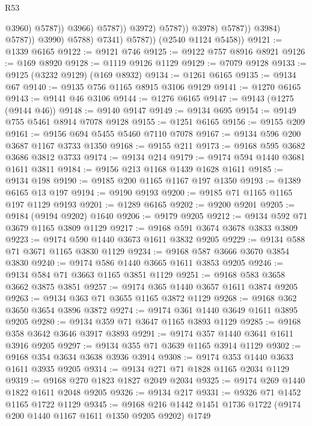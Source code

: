 \begin{lexlean}{R53}
\begin{coremodule}
                                              @3960)
                                            @5787))
                                        @3966)
                                      @5787))
                                  @3972)
                                @5787))
                            @3978)
                          @5787))
                      @3984)
                    @5787))
                @3990)
              @5788)
            @7341)
          @5787))
      (@2540 @1124 @5458))
@9121 := @1339 @6165
@9122 := @9121 @746
@9125 := @9122 @757 @8916 @8921
@9126 := @169 @8920
@9128 := @1119 @9126 @1129
@9129 := @7079 @9128
@9133 := @9125 (@3232 @9129) (@169 @8932)
@9134 := @1261 @6165
@9135 := @9134 @67
@9140 := @9135 @756 @1165 @8915 @3106 @9129
@9141 := @1270 @6165
@9143 := @9141 @46 @3106
@9144 := @1276 @6165
@9147 := @9143 (@1275 (@9144 @46))
@9148 := @9140 @9147
@9149 := @9134 @695
@9154 := @9149 @755 @5461 @8914 @7078 @9128
@9155 := @1251 @6165
@9156 := @9155 @209
@9161 := @9156 @694 @5455 @5460 @7110 @7078
@9167 := @9134 @596 @200 @3687 @1167 @3733 @1350
@9168 := @9155 @211
@9173 := @9168 @595 @3682 @3686 @3812 @3733
@9174 := @9134 @214
@9179 := @9174 @594 @1440 @3681 @1611 @3811
@9184 := @9156 @213 @1168 @1439 @1628 @1611
@9185 := @9134 @198
@9190 := @9185 @200 @1165 @1167 @197 @1350
@9193 := @1389 @6165 @13 @197
@9194 := @9190 @9193
@9200 := @9185 @71 @1165 @1165 @197 @1129 @9193
@9201 := @1289 @6165
@9202 := @9200 @9201
@9205 := @9184 (@9194 @9202) @1640
@9206 := @9179 @9205
@9212 := @9134 @592 @71 @3679 @1165 @3809 @1129
@9217 := @9168 @591 @3674 @3678 @3833 @3809
@9223 := @9174 @590 @1440 @3673 @1611 @3832 @9205
@9229 := @9134 @588 @71 @3671 @1165 @3830 @1129
@9234 := @9168 @587 @3666 @3670 @3854 @3830
@9240 := @9174 @586 @1440 @3665 @1611 @3853 @9205
@9246 := @9134 @584 @71 @3663 @1165 @3851 @1129
@9251 := @9168 @583 @3658 @3662 @3875 @3851
@9257 := @9174 @365 @1440 @3657 @1611 @3874 @9205
@9263 := @9134 @363 @71 @3655 @1165 @3872 @1129
@9268 := @9168 @362 @3650 @3654 @3896 @3872
@9274 := @9174 @361 @1440 @3649 @1611 @3895 @9205
@9280 := @9134 @359 @71 @3647 @1165 @3893 @1129
@9285 := @9168 @358 @3642 @3646 @3917 @3893
@9291 := @9174 @357 @1440 @3641 @1611 @3916 @9205
@9297 := @9134 @355 @71 @3639 @1165 @3914 @1129
@9302 := @9168 @354 @3634 @3638 @3936 @3914
@9308 := @9174 @353 @1440 @3633 @1611 @3935 @9205
@9314 := @9134 @271 @71 @1828 @1165 @2034 @1129
@9319 := @9168 @270 @1823 @1827 @2049 @2034
@9325 := @9174 @269 @1440 @1822 @1611 @2048 @9205
@9326 := @9134 @217
@9331 := @9326 @71 @1452 @1165 @1722 @1129
@9345 := @9168 @216 @1442 @1451 @1736 @1722 (@9174 @200 @1440 @1167 @1611 @1350 @9205 @9202) @1749

\end{coremodule}
\end{lexlean}
